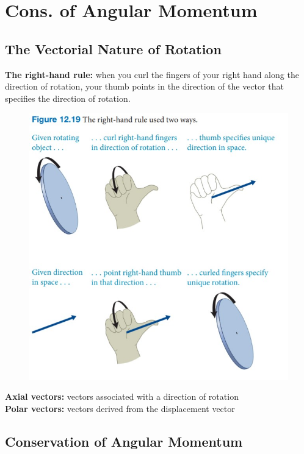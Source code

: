 \section{Cons. of Angular Momentum}

    \subsection{The Vectorial Nature of Rotation}

        \textbf{The right-hand rule:} when you curl the fingers of your right hand along the direction of rotation, your thumb points in the direction of the vector that specifies the direction of rotation.

        \begin{figure}[hbt!]
            \centering
            \includegraphics[scale=0.75]{Resources/right_hand_rule}
        \end{figure}

        \textbf{Axial vectors:} vectors associated with a direction of rotation \\
        \textbf{Polar vectors:} vectors derived from the displacement vector

    \subsection{Conservation of Angular Momentum}

